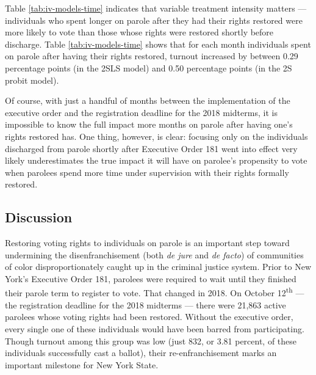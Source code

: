 \documentclass[
  12pt,
]{article}
\begin{document}
\begin{singlespace}

\end{singlespace}

Table \ref{tab:iv-models-time} indicates that variable treatment intensity matters --- individuals who spent longer on parole after they had their rights restored were more likely to vote than those whose rights were restored shortly before discharge. Table \ref{tab:iv-models-time} shows that for each month individuals spent on parole after having their rights restored, turnout increased by between 0.29 percentage points (in the 2SLS model) and 0.50 percentage points (in the 2S probit model).

Of course, with just a handful of months between the implementation of the executive order and the registration deadline for the 2018 midterms, it is impossible to know the full impact more months on parole after having one's rights restored has. One thing, however, is clear: focusing only on the individuals discharged from parole shortly after Executive Order 181 went into effect very likely underestimates the true impact it will have on parolee's propensity to vote when parolees spend more time under supervision with their rights formally restored.

\hypertarget{discussion}{%
\subsection*{Discussion}\label{discussion}}

Restoring voting rights to individuals on parole is an important step toward undermining the disenfranchisement (both \emph{de jure} and \emph{de facto}) of communities of color disproportionately caught up in the criminal justice system. Prior to New York's Executive Order 181, parolees were required to wait until they finished their parole term to register to vote. That changed in 2018. On October 12\textsuperscript{th} --- the registration deadline for the 2018 midterms --- there were 21,863 active parolees whose voting rights had been restored. Without the executive order, every single one of these individuals would have been barred from participating. Though turnout among this group was low (just 832, or 3.81 percent, of these individuals successfully cast a ballot), their re-enfranchisement marks an important milestone for New York State.
\end{document}

